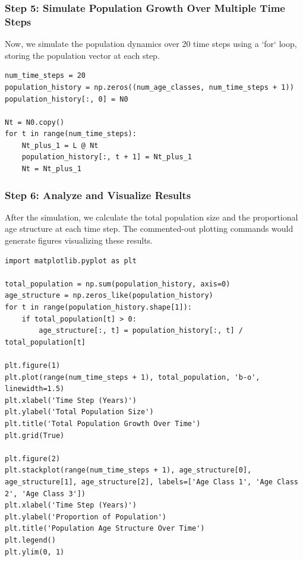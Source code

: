 \documentclass{article}
\begin{document}
\subsubsection{Step 5: Simulate Population Growth Over Multiple Time Steps}
Now, we simulate the population dynamics over 20 time steps using a `for` loop, storing the population vector at each step.
\begin{lstlisting}[caption={Simulate population over time}]
num_time_steps = 20
population_history = np.zeros((num_age_classes, num_time_steps + 1))
population_history[:, 0] = N0

Nt = N0.copy()
for t in range(num_time_steps):
    Nt_plus_1 = L @ Nt
    population_history[:, t + 1] = Nt_plus_1
    Nt = Nt_plus_1
\end{lstlisting}

\subsubsection{Step 6: Analyze and Visualize Results}
After the simulation, we calculate the total population size and the proportional age structure at each time step. The commented-out plotting commands would generate figures visualizing these results.
\begin{lstlisting}[caption={Analyze simulation results (Calculation part)}]
import matplotlib.pyplot as plt

total_population = np.sum(population_history, axis=0)
age_structure = np.zeros_like(population_history)
for t in range(population_history.shape[1]):
    if total_population[t] > 0:
        age_structure[:, t] = population_history[:, t] / total_population[t]

plt.figure(1)
plt.plot(range(num_time_steps + 1), total_population, 'b-o', linewidth=1.5)
plt.xlabel('Time Step (Years)')
plt.ylabel('Total Population Size')
plt.title('Total Population Growth Over Time')
plt.grid(True)

plt.figure(2)
plt.stackplot(range(num_time_steps + 1), age_structure[0], age_structure[1], age_structure[2], labels=['Age Class 1', 'Age Class 2', 'Age Class 3'])
plt.xlabel('Time Step (Years)')
plt.ylabel('Proportion of Population')
plt.title('Population Age Structure Over Time')
plt.legend()
plt.ylim(0, 1)
\end{lstlisting}
\end{document}
